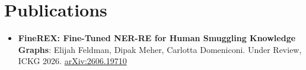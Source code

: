 \documentclass[letterpaper,11pt]{article}
\newcommand{\resumeItem}[2]{
  \item\small{
    \textbf{#1}{: #2 \vspace{-2pt}}
  }
}
\newcommand{\resumeSubItem}[2]{\resumeItem{#1}{#2}\vspace{-4pt}}
\newcommand{\resumeSubHeadingListStart}{\begin{itemize}[leftmargin=*]}
\newcommand{\resumeSubHeadingListEnd}{\end{itemize}}
\begin{document}
\section{Publications}
  \resumeSubHeadingListStart
    \resumeSubItem{FineREX: Fine-Tuned NER-RE for Human Smuggling Knowledge Graphs}
      {
        Elijah Feldman, Dipak Meher, Carlotta Domeniconi. Under Review, ICKG 2026. \href{https://arxiv.org/abs/2606.19710}{arXiv:2606.19710}
      }
  \resumeSubHeadingListEnd

\end{document}
